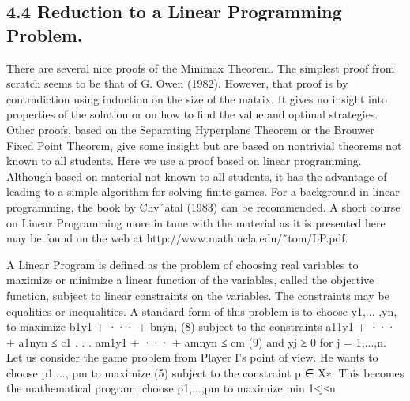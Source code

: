 \documentclass[]{report}
\begin{document}
\subsection{4.4 Reduction to a Linear Programming Problem.} There are several nice proofs
of the Minimax Theorem. The simplest proof from scratch seems to be that of G. Owen
(1982). However, that proof is by contradiction using induction on the size of the matrix.
It gives no insight into properties of the solution or on how to find the value and optimal
strategies. Other proofs, based on the Separating Hyperplane Theorem or the Brouwer
Fixed Point Theorem, give some insight but are based on nontrivial theorems not known
to all students.
Here we use a proof based on linear programming. Although based on material not
known to all students, it has the advantage of leading to a simple algorithm for solving
finite games. For a background in linear programming, the book by Chv´atal (1983) can be
recommended. A short course on Linear Programming more in tune with the material as
it is presented here may be found on the web at http://www.math.ucla.edu/˜tom/LP.pdf.

A Linear Program is defined as the problem of choosing real variables to maximize or
minimize a linear function of the variables, called the objective function, subject to linear
constraints on the variables. The constraints may be equalities or inequalities. A standard
form of this problem is to choose y1,... ,yn, to
maximize b1y1 + ··· + bnyn, (8)
subject to the constraints
a11y1 + ··· + a1nyn ≤ c1
.
.
.
am1y1 + ··· + amnyn ≤ cm
(9)
and
yj ≥ 0 for j = 1,...,n.
Let us consider the game problem from Player I’s point of view. He wants to choose
p1,..., pm to maximize (5) subject to the constraint p ∈ X∗. This becomes the mathematical
program: choose p1,...,pm to
maximize min
1≤j≤n
\end{document}
